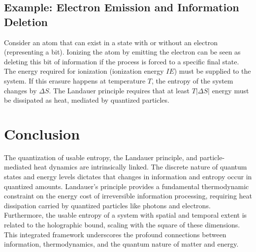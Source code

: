\documentclass{article}
\begin{document}
		\subsection{Example: Electron Emission and Information Deletion}
		Consider an atom that can exist in a state with or without an electron (representing a bit). Ionizing the atom by emitting the electron can be seen as deleting this bit of information if the process is forced to a specific final state. The energy required for ionization (ionization energy $IE$) must be supplied to the system. If this erasure happens at temperature $T$, the entropy of the system changes by $\Delta S$. The Landauer principle requires that at least $T |\Delta S|$ energy must be dissipated as heat, mediated by quantized particles.
		
		\section{Conclusion}
		The quantization of usable entropy, the Landauer principle, and particle-mediated heat dynamics are intrinsically linked. The discrete nature of quantum states and energy levels dictates that changes in information and entropy occur in quantized amounts. Landauer's principle provides a fundamental thermodynamic constraint on the energy cost of irreversible information processing, requiring heat dissipation carried by quantized particles like photons and electrons. Furthermore, the usable entropy of a system with spatial and temporal extent is related to the holographic bound, scaling with the square of these dimensions. This integrated framework underscores the profound connections between information, thermodynamics, and the quantum nature of matter and energy.
		
	
\end{document}

